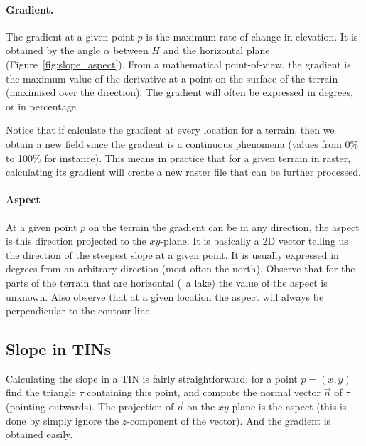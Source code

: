 \paragraph{Gradient.} 
The gradient at a given point $p$ is the maximum rate of change in elevation. 
It is obtained by the angle $\alpha$ between $H$ and the horizontal plane (Figure~\ref{fig:slope_aspect}).
From a mathematical point-of-view, the gradient is the maximum value of the derivative at a point on the surface of the terrain (maximised over the direction).
The gradient will often be expressed in degrees, or in percentage.

Notice that if calculate the gradient at every location for a terrain, then we obtain a new field since the gradient is a continuous phenomena (values from 0\% to 100\% for instance).
This means in practice that for a given terrain in raster, calculating its gradient will create a new raster file that can be further processed.


\paragraph{Aspect}
At a given point $p$ on the terrain the gradient can be in any direction, the aspect is this direction projected to the $xy$-plane. 
It is basically a 2D vector telling us the direction of the steepest slope at a given point.
It is usually expressed in degrees from an arbitrary direction (most often the north).
Observe that for the parts of the terrain that are horizontal (\eg\ a lake) the value of the aspect is unknown.
Also observe that at a given location the aspect will always be perpendicular to the contour line.





\subsection{Slope in TINs}

Calculating the slope in a TIN is fairly straightforward: for a point $p=(x,y)$ find the triangle $\tau$ containing this point, and compute the normal vector $\vec{n}$ of $\tau$ (pointing outwards). 
The projection of $\vec{n}$ on the $xy$-plane is the aspect (this is done by simply ignore the $z$-component of the vector).
And the gradient is obtained easily.

